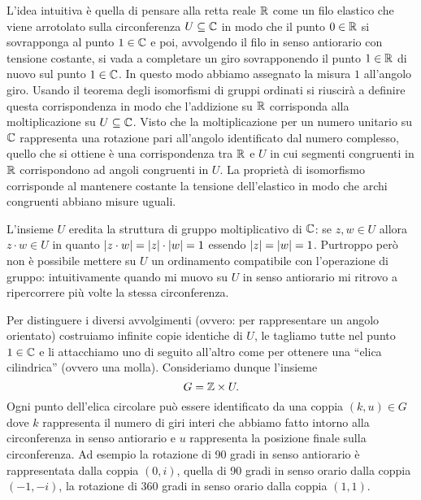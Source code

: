 L'idea intuitiva è quella di pensare alla retta reale ${\mathbb R}$ come un filo 
elastico che viene arrotolato sulla circonferenza $U\subseteq {\mathbb C}$ in modo che il punto $0\in {\mathbb R}$ 
si sovrapponga al punto $1\in {\mathbb C}$ e poi, avvolgendo il filo in senso antiorario 
con tensione costante, 
si vada a completare un giro sovrapponendo il punto $1\in {\mathbb R}$ di nuovo sul punto 
$1\in {\mathbb C}$. 
In questo modo abbiamo assegnato la misura $1$ all'angolo giro.
Usando il teorema degli isomorfismi di gruppi ordinati si riuscirà a definire 
questa corrispondenza in modo che l'addizione su ${\mathbb R}$ corrisponda alla moltiplicazione 
su $U\subseteq {\mathbb C}$. 
Visto che la moltiplicazione per un numero unitario su ${\mathbb C}$ rappresenta 
una rotazione pari all'angolo identificato dal numero complesso, 
quello che si ottiene è una corrispondenza tra ${\mathbb R}$ e $U$ in cui 
segmenti congruenti in ${\mathbb R}$ corrispondono ad angoli congruenti in $U$.
La proprietà di isomorfismo corrisponde al mantenere costante la tensione 
dell'elastico in modo che archi congruenti abbiano misure uguali.

L'insieme $U$ eredita la struttura di gruppo moltiplicativo di ${\mathbb C}$: 
se $z,w\in U$ 
allora $z\cdot w \in U$ in quanto ${\left|z\cdot w\right|} = {\left|z\right|}\cdot {\left|w\right|} = 1$
essendo ${\left|z\right|}={\left|w\right|}=1$. 
Purtroppo però non è possibile mettere su $U$ 
un ordinamento compatibile con l'operazione di gruppo: intuitivamente 
quando mi muovo su $U$ in senso antiorario mi ritrovo a ripercorrere più volte 
la stessa circonferenza.

Per distinguere i diversi avvolgimenti 
(ovvero: per rappresentare un angolo orientato) 
costruiamo infinite copie identiche di $U$,
le tagliamo tutte nel punto $1\in {\mathbb C}$ e li attacchiamo 
uno di seguito all'altro come per ottenere una ``elica cilindrica'' 
(ovvero una molla).
Consideriamo dunque l'insieme
\[
  G = {\mathbb Z} \times U.
\]
Ogni punto dell'elica circolare può essere identificato 
da una coppia $(k,u)\in G$ dove 
$k$ rappresenta il numero di giri interi che abbiamo fatto 
intorno alla circonferenza in senso antiorario 
e $u$ rappresenta la posizione finale sulla circonferenza.
Ad esempio la rotazione di 90 gradi in senso antiorario 
è rappresentata dalla coppia $(0,i)$, quella di 90 gradi 
in senso orario dalla coppia $(-1,-i)$, la rotazione 
di 360 gradi in senso orario dalla coppia $(1,1)$.


